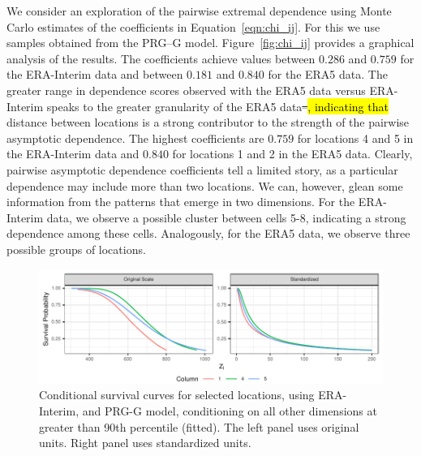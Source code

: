 \documentclass[iicol,sn-basic]{sn-jnl}
\theoremstyle{thmstyleone}
\begin{document}
We consider an exploration of the pairwise extremal dependence using Monte Carlo estimates of the coefficients in  Equation~\ref{eqn:chi_ij}. For this we use samples obtained from the PRG--G model. Figure~\ref{fig:chi_ij} provides a graphical analysis of the results. The coefficients achieve values between $0.286$ and $0.759$ for the ERA-Interim data and between $0.181$ and $0.840$ for the ERA5 data.  The greater range in dependence scores observed with the ERA5 data versus ERA-Interim speaks to the greater granularity of the ERA5 data\st{--}\hl{, indicating that }distance between locations is a strong contributor to the strength of the pairwise asymptotic dependence. The highest coefficients are $0.759$ for locations 4 and 5 in the ERA-Interim data and $0.840$ for locations 1 and 2 in the ERA5 data.  Clearly, pairwise asymptotic dependence coefficients tell a limited story, as a particular dependence may include more than two locations.   We can, however, glean some information from the patterns that emerge in two dimensions.  For the ERA-Interim data, we observe a possible cluster between cells 5-8, indicating a strong dependence among these cells.  Analogously, for the ERA5 data, we observe three possible groups of locations.

\begin{figure}[htb]
\centering
\caption{Conditional survival curves for selected locations, using ERA-Interim, and PRG-G model,  conditioning on all other dimensions at greater than 90th percentile (fitted)\label{fig:condsurv1d}. The left panel uses original units. Right panel uses standardized units.}
\includegraphics[width=\linewidth]{./images/condsurv_1d}
\end{figure}
\end{document}
